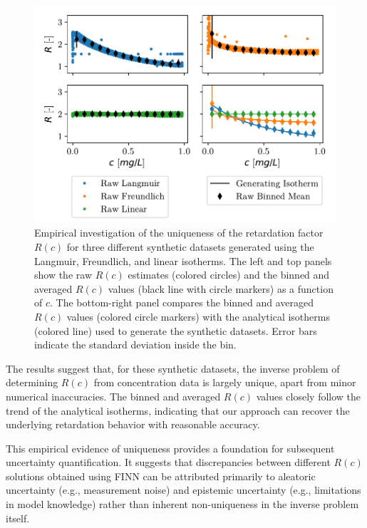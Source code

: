 \begin{figure}[h]
    \centering
    \includegraphics{figs/ret_uniqueness.pdf}
    \caption{Empirical investigation of the uniqueness of the retardation factor $R(c)$ for three different synthetic datasets generated using the Langmuir, Freundlich, and linear isotherms. The left and top panels show the raw $R(c)$ estimates (colored circles) and the binned and averaged $R(c)$ values (black line with circle markers) as a function of $c$. The bottom-right panel compares the binned and averaged $R(c)$ values (colored circle markers) with the analytical isotherms (colored line) used to generate the synthetic datasets. Error bars indicate the standard deviation inside the bin.}
    \label{fig:ret_uniqueness}
\end{figure}

The results suggest that, for these synthetic datasets, the inverse problem of determining $R(c)$ from concentration data is largely unique, apart from minor numerical inaccuracies. The binned and averaged $R(c)$ values closely follow the trend of the analytical isotherms, indicating that our approach can recover the underlying retardation behavior with reasonable accuracy.

This empirical evidence of uniqueness provides a foundation for subsequent uncertainty quantification. It suggests that discrepancies between different $R(c)$ solutions obtained using FINN can be attributed primarily to aleatoric uncertainty (e.g., measurement noise) and epistemic uncertainty (e.g., limitations in model knowledge) rather than inherent non-uniqueness in the inverse problem itself.




